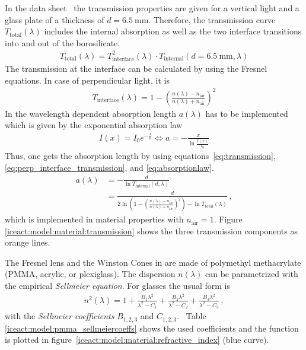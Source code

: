 In the data sheet~\cite{iceact:borosilicate:datasheet} the transmission properties are given for a vertical light and a glass plate of a thickness of $d = \SI{6.5}{\milli\meter}$. Therefore, the transmission curve $T_\text{total}(\lambda)$ includes the internal absorption as well as the two interface transitions into and out of the borosilicate.
\begin{align}
	T_\text{total}(\lambda) = T_\text{interface}^2(\lambda)\cdot T_\text{internal}(d=\SI{6.5}{\milli\meter},\lambda)
	\label{eq:transmission}
\end{align}
The transmission at the interface can be calculated by using the Fresnel equations. In case of perpendicular light, it is
\begin{align}
	T_\text{interface}(\lambda) = 1 - \left(\frac{n(\lambda)-n_\text{air}}{n(\lambda)+n_\text{air}}\right)^2
	\label{eq:perp_interface_transmission}
\end{align}
In \geant the wavelength dependent absorption length $a(\lambda)$ has to be implemented which is given by the exponential absorption law
\begin{align}
	I(x) = I_0 e^{-\frac{x}{a}} \Leftrightarrow a = - \frac{x}{\ln{\frac{I(x)}{I_0}}}
	\label{eq:absorptionlaw}
\end{align}
Thus, one gets the absorption length by using equations~\eqref{eq:transmission}, \eqref{eq:perp_interface_transmission}, and \eqref{eq:absorptionlaw}.
\begin{align}
	a(\lambda) &= - \frac{d}{\ln T_\text{internal}(d,\lambda)}\\
	&= \frac{d}{2\ln\left(1 - \left(\frac{n(\lambda)-n_\text{air}}{n(\lambda)+n_\text{air}}\right)^2\right)-\ln T_\text{total}(\lambda)}\,,
\end{align}
which is implemented in \geant material properties with $n_\text{air} = 1$. Figure \ref{iceact:model:material:transmission} shows the three transmission components as orange lines.

The Fresnel lens and the Winston Cones in \iceact are made of polymethyl methacrylate (PMMA, acrylic, or plexiglass). The dispersion $n(\lambda)$ can be parametrized with the empirical \textit{Sellmeier equation}. For glasses the usual form is
\begin{align}
	n^2(\lambda) = 1 + \frac{B_1\lambda^2}{\lambda^2-C_1} + \frac{B_2\lambda^2}{\lambda^2-C_2} + \frac{B_3\lambda^2}{\lambda^2-C_3}\,,
	\label{eq:sellmeier}
\end{align}
with the \textit{Sellmeier coefficients} $B_{1,2,3}$ and $C_{1,2,3}$.~\cite{iceact:sellmeier} Table \ref{iceact:model:pmma_sellmeiercoeffs} shows the used coefficients and the function is plotted in figure~\ref{iceact:model:material:refractive_index} (blue curve).

